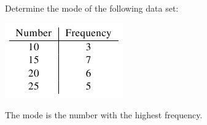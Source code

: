 \documentclass{ximera}
\begin{document}
\begin{question}
Determine the mode of the following data set:
\begin{image}
\includegraphics{StatsTable2.png}%
\end{image}

    \begin{hint}
      The mode is the number with the highest frequency.
    \end{hint}
    \begin{multipleChoice}
    \end{multipleChoice}

\end{question}
\end{document}
